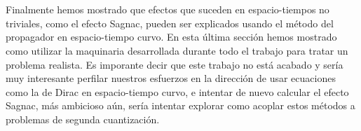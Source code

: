\\
\\
Finalmente hemos mostrado que efectos que suceden en espacio-tiempos no triviales, como el efecto Sagnac, pueden ser explicados usando el método del propagador en espacio-tiempo curvo. En esta última sección hemos mostrado como utilizar la maquinaria desarrollada durante todo el trabajo para tratar un problema realista. Es imporante decir que este trabajo no está acabado y sería muy interesante perfilar nuestros esfuerzos en la dirección de usar ecuaciones como la de Dirac en espacio-tiempo curvo, e intentar de nuevo calcular el efecto Sagnac, más ambicioso aún, sería intentar explorar como acoplar estos métodos a problemas de segunda cuantización.